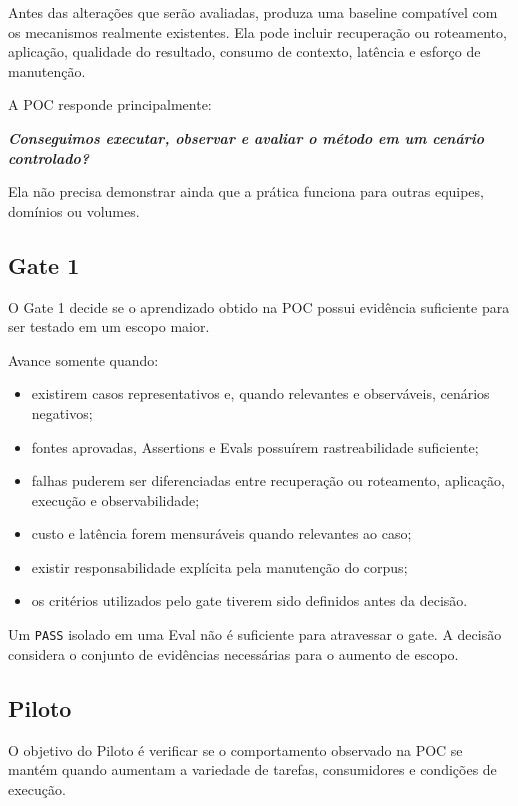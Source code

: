 \documentclass[
  10pt,
  a4paper,
  oneside]{book}
\providecommand{\tightlist}{%
  \setlength{\itemsep}{0pt}\setlength{\parskip}{0pt}}
\renewenvironment{quote}
  {\def\FrameCommand{\fboxsep=10pt\colorbox{LightBlue}}%
   \MakeFramed{\advance\hsize-\width\FrameRestore}\itshape}
  {\endMakeFramed}
\begin{document}
Antes das alterações que serão avaliadas, produza uma baseline
compatível com os mecanismos realmente existentes. Ela pode incluir
recuperação ou roteamento, aplicação, qualidade do resultado, consumo de
contexto, latência e esforço de manutenção.

A POC responde principalmente:

\begin{quote}
\textbf{Conseguimos executar, observar e avaliar o método em um cenário
controlado?}
\end{quote}

Ela não precisa demonstrar ainda que a prática funciona para outras
equipes, domínios ou volumes.

\hypertarget{gate-1}{%
\subsection{Gate 1}\label{gate-1}}

O Gate 1 decide se o aprendizado obtido na POC possui evidência
suficiente para ser testado em um escopo maior.

Avance somente quando:

\begin{itemize}
\tightlist
\item
  existirem casos representativos e, quando relevantes e observáveis,
  cenários negativos;
\item
  fontes aprovadas, Assertions e Evals possuírem rastreabilidade
  suficiente;
\item
  falhas puderem ser diferenciadas entre recuperação ou roteamento,
  aplicação, execução e observabilidade;
\item
  custo e latência forem mensuráveis quando relevantes ao caso;
\item
  existir responsabilidade explícita pela manutenção do corpus;
\item
  os critérios utilizados pelo gate tiverem sido definidos antes da
  decisão.
\end{itemize}

Um \texttt{PASS} isolado em uma Eval não é suficiente para atravessar o
gate. A decisão considera o conjunto de evidências necessárias para o
aumento de escopo.

\hypertarget{piloto}{%
\subsection{Piloto}\label{piloto}}

O objetivo do Piloto é verificar se o comportamento observado na POC se
mantém quando aumentam a variedade de tarefas, consumidores e condições
de execução.
\end{document}
